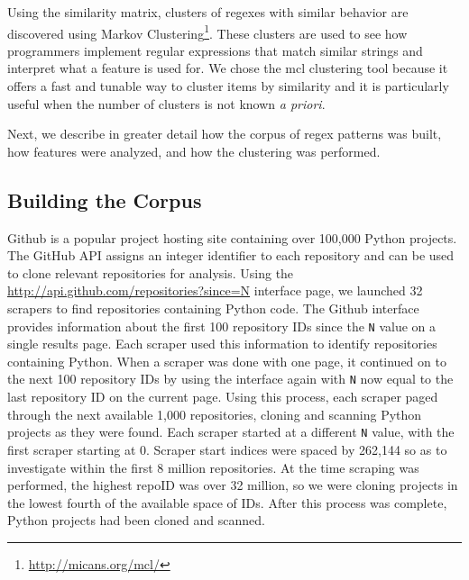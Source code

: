 Using the similarity matrix, clusters of regexes with similar behavior are discovered using Markov Clustering\footnote{\url{http://micans.org/mcl/}}.  These clusters are used to see how programmers implement regular expressions that match similar strings and interpret what a feature is used for.
 We chose the mcl clustering tool because it offers a fast and tunable way to cluster items by similarity and it is particularly useful when the number of clusters is not known \emph{a priori}.


Next, we describe in greater detail how the corpus of regex patterns was built, how features were analyzed, and how the clustering was performed.




\subsection{Building the Corpus}
\label{study:corpus}
Github is a popular project hosting site containing over 100,000 Python projects.  The GitHub API assigns an integer identifier to each repository and can be used to clone relevant repositories for analysis.  Using the \url{http://api.github.com/repositories?since=N} interface page, we launched 32 scrapers to find repositories containing Python code.  The Github interface provides information about the first 100 repository IDs since the {\tt N} value on a single results page.  Each scraper used this information to identify repositories containing Python.  When a scraper was done with one page, it continued on to the next 100 repository IDs by using the interface again with {\tt N} now equal to the last repository ID on the current page.  Using this process, each scraper paged through the next available 1,000 repositories, cloning and scanning Python projects as they were found.  Each scraper started at a different {\tt N} value, with the first scraper starting at 0.  Scraper start indices were spaced by 262,144 so as to investigate within the first 8 million repositories.  At the time scraping was performed, the highest repoID was over 32 million, so we were cloning projects in the lowest fourth of the available space of IDs.  After this process was complete,  Python projects had been cloned and scanned.

